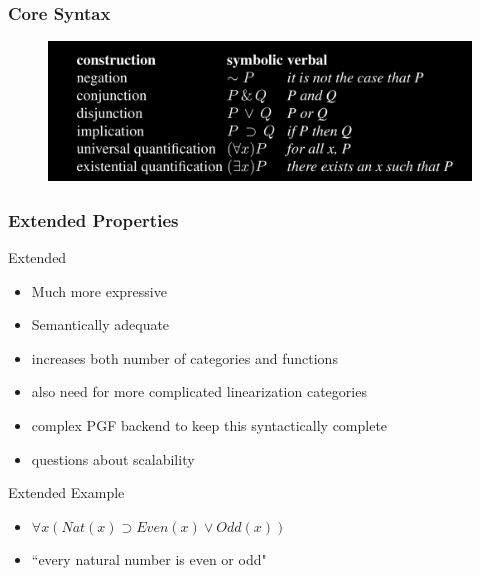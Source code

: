 \documentclass[10pt]{beamer}
\begin{document}
\begin{frame}
\frametitle{Core Syntax}

\begin{figure}
\hspace*{-3mm}%
   \includegraphics[width= \paperwidth]{core.png}
\end{figure}

\end{frame}

\begin{frame}
\frametitle{Extended Properties}

\begin{block}{Extended}
\begin{itemize}
\item Much more expressive
\item Semantically adequate
\item increases both number of categories and functions
\item also need for more complicated linearization categories
\item complex PGF backend to keep this syntactically complete
\item questions about scalability
\end{itemize}

\end{block}

\begin{exampleblock}{Extended Example}
\begin{itemize}
\item $\forall x (Nat(x) \supset Even(x) \lor Odd(x))$
\item ``every natural number is even or odd"
\end{itemize}
\end{exampleblock}

\end{frame}
\end{document}
